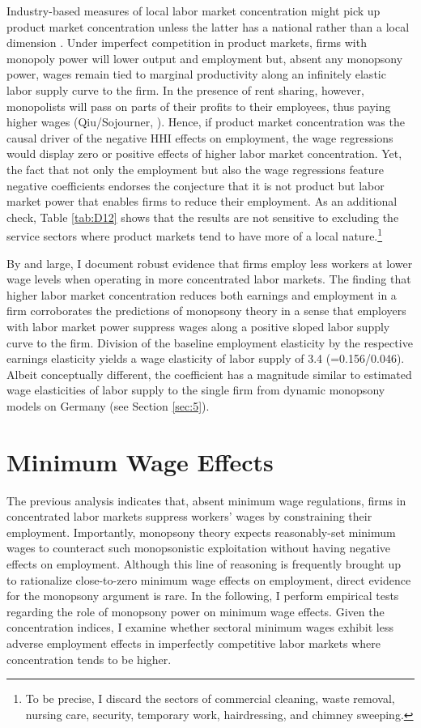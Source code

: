 \documentclass[11pt,oneside,reqno,xcolor=dvipsnames]{article} %
\begin{document}
Industry-based measures of local labor market concentration might pick up product market concentration unless the latter has a national rather than a local dimension \citep{Manning2021}. Under imperfect competition in product markets, firms with monopoly power will lower output and employment \citep{MarinescuEtAl2021} but, absent any monopsony power, wages remain tied to marginal productivity along an infinitely elastic labor supply curve to the firm. In the presence of rent sharing, however, monopolists will pass on parts of their profits to their employees, thus paying higher wages (Qiu/Sojourner, \citeyear{QiuSojourner2019}). Hence, if product market concentration was the causal driver of the negative HHI effects on employment, the wage regressions would display zero or positive effects of higher labor market concentration. Yet, the fact that not only the employment but also the wage regressions feature negative coefficients endorses the conjecture that it is not product but labor market power that enables firms to reduce their employment. As an additional check, Table \ref{tab:D12} shows that the results are not sensitive to excluding the service sectors where product markets tend to have more of a local nature.\footnote{To be precise, I discard the sectors of commercial cleaning, waste removal, nursing care, security, temporary work, hairdressing, and chimney sweeping.}

By and large, I document robust evidence that firms employ less workers at lower wage levels when operating in more concentrated labor markets. The finding that higher labor market concentration reduces both earnings and employment in a firm corroborates the predictions of monopsony theory in a sense that employers with labor market power suppress wages along a positive sloped labor supply curve to the firm. Division of the baseline employment elasticity by the respective earnings elasticity yields a wage elasticity of labor supply of 3.4 (=0.156/0.046). Albeit conceptually different, the coefficient has a magnitude similar to estimated wage elasticities of labor supply to the single firm from dynamic monopsony models on Germany (see Section \ref{sec:5}).



\section{Minimum Wage Effects}
\label{sec:7}

The previous analysis indicates that, absent minimum wage regulations, firms in concentrated labor markets suppress workers' wages by constraining their employment. Importantly, monopsony theory expects reasonably-set minimum wages to counteract such monopsonistic exploitation without having negative effects on employment. Although this line of reasoning is frequently brought up to rationalize close-to-zero minimum wage effects on employment, direct evidence for the monopsony argument is rare. In the following, I perform empirical tests regarding the role of monopsony power on minimum wage effects. Given the concentration indices, I examine whether sectoral minimum wages exhibit less adverse employment effects in imperfectly competitive labor markets where concentration tends to be higher.
\end{document}
